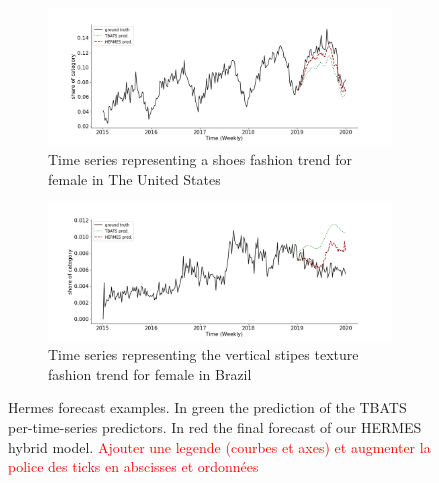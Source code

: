 \documentclass{article} %
\newcommand{\ts}{y}
\newcommand{\fullts}{{\bf \ts}}
\begin{document}
\begin{figure}
\centering
\begin{subfigure}{1.\textwidth}
  \centering
  \includegraphics[width=1.\linewidth]{figure/us_female_shoes}
  \caption{Time series representing a shoes fashion trend for female in The United States}
  \label{fig:introexamples:sub1}
\end{subfigure}
\begin{subfigure}{1.\textwidth}
  \centering
  \includegraphics[width=1.\linewidth]{figure/br_female_texture_verticalstripe}
  \caption{Time series representing the vertical stipes texture fashion trend for female in Brazil}
  \label{fig:introexamples:sub2}
\end{subfigure}
\caption{Hermes forecast examples. In green the prediction of the TBATS per-time-series predictors. In red the final forecast of our HERMES hybrid model. \textcolor{red}{Ajouter une legende (courbes et axes) et augmenter la police des ticks en abscisses et ordonnées}}
\label{fig:introexamples}
\end{figure}

\end{document}
